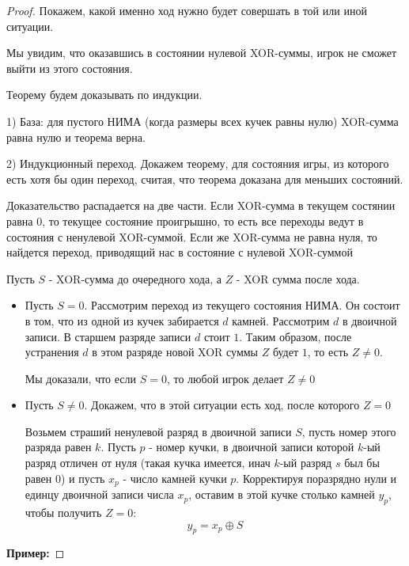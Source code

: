 \documentclass[aps,%
12pt,%
final,%
oneside,
onecolumn,%
musixtex, %
superscriptaddress,%
centertags]{article} %
\theoremstyle{plain}
\theoremstyle{definition}
\theoremstyle{remark}
\begin{document}
\begin{proof}
  Покажем, какой именно ход нужно будет совершать в той или иной ситуации.

  Мы увидим, что оказавшись в состоянии нулевой \textsc{XOR}-суммы, игрок не сможет выйти из этого состояния.

  Теорему будем доказывать по индукции.

  1) База: для пустого НИМА (когда размеры всех кучек равны нулю) \textsc{XOR}-сумма равна нулю и теорема верна.

  2) Индукционный переход. Докажем теорему, для состояния игры, из которого есть хотя бы один переход, считая, что теорема доказана для меньших состояний.

  Доказательство распадается на две части. Если \textsc{XOR}-сумма в текущем состянии равна $0$, то текущее состояние проигрышно, то есть все переходы ведут в состояния с ненулевой \textsc{XOR}-суммой. Если же \textsc{XOR}-сумма не равна нуля, то найдется переход, приводящий нас в состояние с нулевой \textsc{XOR}-суммой

  Пусть $S$ - \textsc{XOR}-сумма до очередного хода, а $Z$ - \textsc{XOR} сумма после хода.

  \begin{itemize}
    \item Пусть $S=0$. Рассмотрим переход из текущего состояния НИМА. Он состоит в том, что из одной из кучек забирается $d$ камней. Рассмотрим $d$ в двоичной записи. В старшем разряде записи $d$ стоит $1$. Таким образом, после устранения $d$ в этом разряде новой \textsc{XOR} суммы $Z$ будет $1$, то есть $Z \neq 0$.

    Мы доказали, что если $S=0$, то любой игрок делает $Z \neq 0$
    \item Пусть $S \neq 0$. Докажем, что в этой ситуации есть ход, после которого $Z=0$

    Возьмем страший ненулевой разряд в двоичной записи $S$, пусть номер этого разряда равен $k$. Пусть $p$ - номер кучки, в двоичной записи которой $k$-ый разряд отличен от нуля (такая кучка имеется, инач $k$-ый разряд $s$ был бы равен $0$) и пусть $x_p$ - число камней кучки $p$. Корректируя поразрядно нули и единцу двоичной записи числа $x_p$, оставим в этой кучке столько камней $y_p$, чтобы получить $Z=0$:
    $$y_p = x_p \oplus S$$
  \end{itemize}

\textbf{Пример:}


\end{proof}
\end{document}
